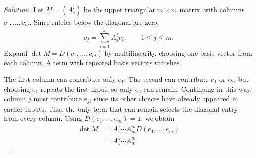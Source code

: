 \begin{proof}[Solution]
Let \(M=(A^i_j)\) be the upper triangular \(m\times m\) matrix, with
columns \(c_1,\ldots,c_m\). Since entries below the diagonal are zero,
\[
  c_j=\sum_{i=1}^j A^i_j e_i,\qquad 1\le j\le m.
\]
Expand \(\det M=D(c_1,\ldots,c_m)\) by multilinearity, choosing one
basis vector from each column. A term with repeated basis vectors vanishes.

The first column can contribute only \(e_1\). The second can contribute
\(e_1\) or \(e_2\), but choosing \(e_1\) repeats the first input, so
only \(e_2\) can remain. Continuing in this way, column \(j\) must
contribute \(e_j\), since its other choices have already appeared in
earlier inputs. Thus the only term that can remain selects the diagonal
entry from every column. Using \(D(e_1,\ldots,e_m)=1\), we obtain
\begin{align*}
  \det M&=A^1_1\cdots A^m_mD(e_1,\ldots,e_m)\\
    &=A^1_1\cdots A^m_m.
\end{align*}
\end{proof}
